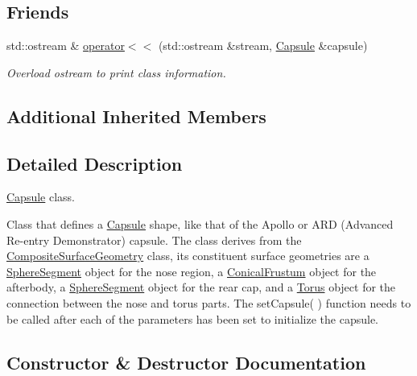 \subsection*{Friends}
\begin{DoxyCompactItemize}
\item 
std\+::ostream \& \hyperlink{classtudat_1_1geometric__shapes_1_1Capsule_a0c1fb05bbdb0ec7b6baebffe664c8f29}{operator$<$$<$} (std\+::ostream \&stream, \hyperlink{classtudat_1_1geometric__shapes_1_1Capsule}{Capsule} \&capsule)
\begin{DoxyCompactList}\small\item\em Overload ostream to print class information. \end{DoxyCompactList}\end{DoxyCompactItemize}
\subsection*{Additional Inherited Members}


\subsection{Detailed Description}
\hyperlink{classtudat_1_1geometric__shapes_1_1Capsule}{Capsule} class. 

Class that defines a \hyperlink{classtudat_1_1geometric__shapes_1_1Capsule}{Capsule} shape, like that of the Apollo or A\+RD (Advanced Re-\/entry Demonstrator) capsule. The class derives from the \hyperlink{classtudat_1_1geometric__shapes_1_1CompositeSurfaceGeometry}{Composite\+Surface\+Geometry} class, its constituent surface geometries are a \hyperlink{classtudat_1_1geometric__shapes_1_1SphereSegment}{Sphere\+Segment} object for the nose region, a \hyperlink{classtudat_1_1geometric__shapes_1_1ConicalFrustum}{Conical\+Frustum} object for the afterbody, a \hyperlink{classtudat_1_1geometric__shapes_1_1SphereSegment}{Sphere\+Segment} object for the rear cap, and a \hyperlink{classtudat_1_1geometric__shapes_1_1Torus}{Torus} object for the connection between the nose and torus parts. The set\+Capsule( ) function needs to be called after each of the parameters has been set to initialize the capsule. 

\subsection{Constructor \& Destructor Documentation}
